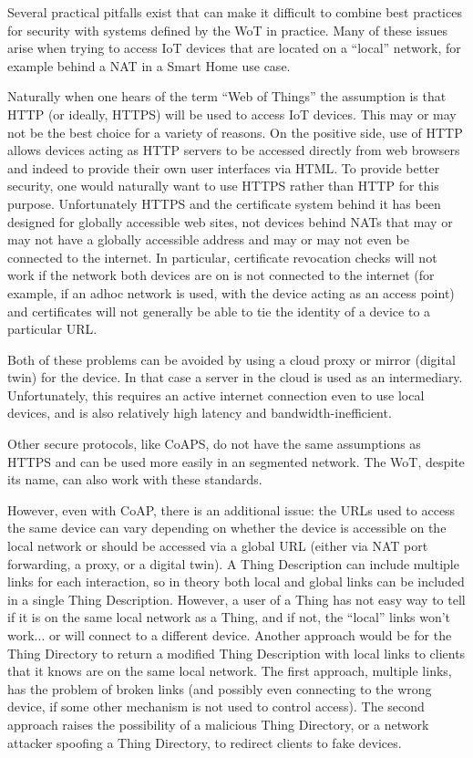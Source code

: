 Several practical pitfalls exist that can make it difficult
to combine best practices for security with systems 
defined by the WoT in practice.
Many of these issues arise when trying to access IoT devices
that are located on a ``local'' network,
for example behind a NAT in a Smart Home use case.

Naturally when one hears of the term ``Web of Things'' the
assumption is that HTTP (or ideally, HTTPS) will be used to
access IoT devices. This may or may not be the best choice
for a variety of reasons.  On the positive side, use of HTTP
allows devices acting as HTTP servers to be accessed directly
from web browsers and indeed to provide their own user
interfaces via HTML.  To provide better security, one would
naturally want to use HTTPS rather than HTTP for this purpose.
Unfortunately HTTPS and the certificate system behind it has
been designed for globally accessible web sites, not devices
behind NATs that may or may not have a globally accessible
address and may or may not even be connected to the internet.
In particular, certificate revocation checks will not work if
the network both devices are on is not connected to the internet
(for example, if an adhoc network is used, with the device acting as
an access point) and certificates will not generally be able 
to tie the identity of a device to a particular URL. 

Both of these problems can be avoided by using a cloud proxy
or mirror (digital twin) for the device.  In that case a server
in the cloud is used as an intermediary.  Unfortunately,
this requires an active internet connection even to use 
local devices, and is also relatively high latency and
bandwidth-inefficient.

Other secure protocols, like CoAPS, 
do not have the same assumptions as HTTPS and can be used
more easily in an segmented network.  
The WoT, despite its name, can also work with these standards.

However, even with CoAP, there is an additional issue: the URLs
used to access the same device can vary depending on whether the
device is accessible on the local network or should be accessed
via a global URL (either via NAT port forwarding, a proxy, or
a digital twin).  A Thing Description can include multiple links
for each interaction, so in theory both local and global links
can be included in a single Thing Description.
However, a user of a Thing has not easy way to tell if it is on
the same local network as a Thing, and if not, the ``local'' links
won't work... or will connect to a different device.  Another
approach would be for the Thing Directory to return a modified
Thing Description with local links to clients that it knows 
are on the same local network.  The first approach, multiple
links, has the problem of broken links (and possibly even 
connecting to the wrong device, if some other mechanism is not
used to control access).  The second approach raises the possibility
of a malicious Thing Directory, or a network attacker spoofing a
Thing Directory, to redirect clients to fake devices.
